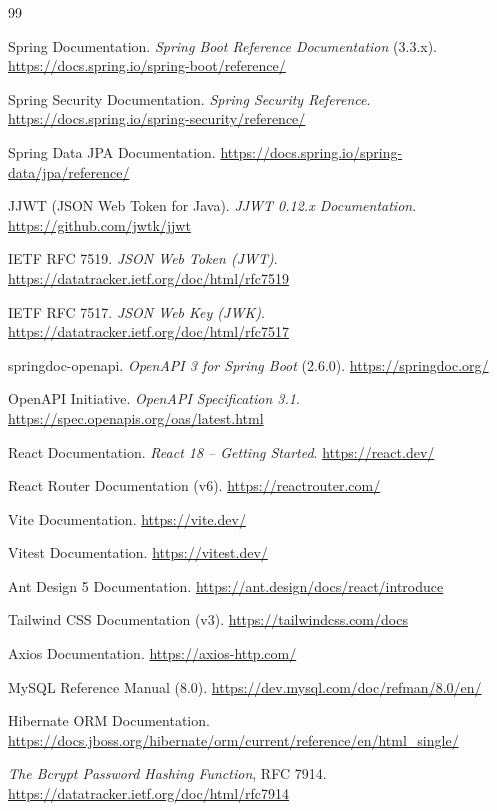 \documentclass[11pt,a4paper]{article}
\begin{document}
\begin{thebibliography}{99}

Spring Documentation.
\emph{Spring Boot Reference Documentation} (3.3.x).
\url{https://docs.spring.io/spring-boot/reference/}

Spring Security Documentation.
\emph{Spring Security Reference}.
\url{https://docs.spring.io/spring-security/reference/}

Spring Data JPA Documentation.
\url{https://docs.spring.io/spring-data/jpa/reference/}

JJWT (JSON Web Token for Java).
\emph{JJWT 0.12.x Documentation}.
\url{https://github.com/jwtk/jjwt}

IETF RFC 7519.
\emph{JSON Web Token (JWT)}.
\url{https://datatracker.ietf.org/doc/html/rfc7519}

IETF RFC 7517.
\emph{JSON Web Key (JWK)}.
\url{https://datatracker.ietf.org/doc/html/rfc7517}

springdoc-openapi.
\emph{OpenAPI 3 for Spring Boot} (2.6.0).
\url{https://springdoc.org/}

OpenAPI Initiative.
\emph{OpenAPI Specification 3.1}.
\url{https://spec.openapis.org/oas/latest.html}

React Documentation.
\emph{React 18 -- Getting Started}.
\url{https://react.dev/}

React Router Documentation (v6).
\url{https://reactrouter.com/}

Vite Documentation.
\url{https://vite.dev/}

Vitest Documentation.
\url{https://vitest.dev/}

Ant Design 5 Documentation.
\url{https://ant.design/docs/react/introduce}

Tailwind CSS Documentation (v3).
\url{https://tailwindcss.com/docs}

Axios Documentation.
\url{https://axios-http.com/}

MySQL Reference Manual (8.0).
\url{https://dev.mysql.com/doc/refman/8.0/en/}

Hibernate ORM Documentation.
\url{https://docs.jboss.org/hibernate/orm/current/reference/en/html_single/}

\emph{The Bcrypt Password Hashing Function}, RFC 7914.
\url{https://datatracker.ietf.org/doc/html/rfc7914}


\end{thebibliography}
\end{document}
